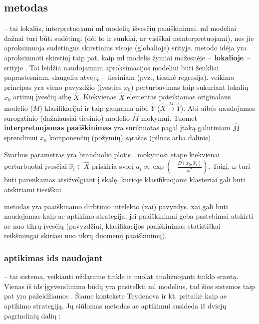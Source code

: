 \subsection{\LIME metodas}\label{sec:literature:lime}

\LIME {} -- tai lokalūs, interpretuojami \gls{ml} modelių išvesčių paaiškinimai. \gls{ml} modeliai dažnai turi būti sudėtingi (dėl to ir sunkiai, ar visiškai neinterpretuojami), nes jie aproksimuoja sudėtingus skirstinius visoje (globalioje) srityje. \LIME metodo idėja yra aproksimuoti skirstinį taip pat, kaip \gls{ml} modelis žymiai mažesnėje --~\textbf{lokalioje}~-- srityje . Tai leidžia \LIME naudojamam aproksimacijos modeliui būti ženkliai paprastesniam, daugeliu atvejų -- tiesiniam (pvz., tiesinė regresija).
\LIME veikimo principas yra vieno pavyzdžio (įvesties $x_0$) perturbavimas taip sukuriant lokalių $x_0$ artimų įvesčių aibę $\hat{X}$. Kiekvienas $\hat{X}$ elementas pateikiamas originalaus modelio ($M$) klasifikacijai ir taip gaunama aibė $\hat{Y}$ ($\hat{X} \xrightarrow{M} \hat{Y}$). Abi aibės naudojamos surogatinio (dažniausiai tiesinio) modelio $\hat{M}$ mokymui. Tuomet \textbf{interpretuojamas paaiškinimas} yra surikiuotas pagal įtaką galutiniam $\hat{M}$ sprendimui $x_0$ komponenčių (požymių) sąrašas (pilnas arba dalinis) \cite{ribeiroWhyShouldTrust2016}.

Svarbus \LIME parametras yra branduolio plotis  \omega. \LIME mokymosi etape kiekvienai perturbuotai įvesčiai $\hat{x}_i \in \hat{X}$ priskiria svorį $a_i \propto \exp\left(-\frac{D(x_0, \hat{x}_i)}{\omega^2}\right)$. Taigi, $\omega$ turi būti parenkamas atsižvelgiant į skalę, kurioje klasifikuojami klasteriai gali būti atskiriami tiesiškai.

\LIME metodas yra paaiškinamo dirbtinio intelekto (\gls{xai}) pavyzdys. \gls{xai} gali būti naudojamas kaip \gls{ae} aptikimo strategija, jei paaiškinimai geba pastebimai atskirti \gls{ae} nuo tikrų įvesčių (pavyzdžiui, klasifikacijos paaiškinimas statistiškai reikšmingai skiriasi nuo tikrų duomenų paaiškinimų).

\subsubsection{ aptikimas \gls{ids} naudojant \LIME}\label{sec:literature:defense:ids}

 -- tai sistema, veikianti uždarame tinkle ir nuolat analizuojanti tinklo srautą. Vienas iš \gls{ids} įgyvendinimo būdų yra pasitelkti \gls{ml} modelius, tad šios sistemos taip pat yra pažeidžiamos . Šiame kontekste Tcydenova ir kt. pritaikė \LIME kaip \gls{ae} aptikimo strategiją. Jų siūlomas metodas  \gls{ae} aptikimui susideda iš dviejų pagrindinių dalių \cite{tcydenovaDetectionAdversarialAttacks2021}:


